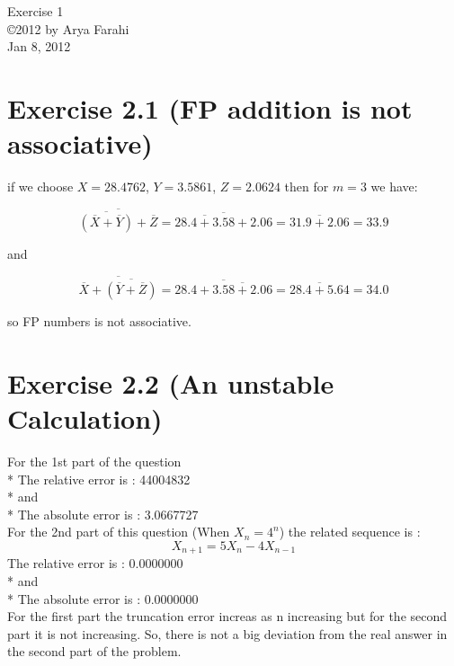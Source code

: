 \documentclass[10pt]{article}
\begin{document}
\begin{center}
{\large Exercise 1} \\
\copyright 2012 by Arya Farahi \\
Jan 8, 2012
\end{center}

\section{Exercise 2.1 (FP addition is not associative)}

if we choose $X = 28.4762$, $Y = 3.5861$, $Z = 2.0624$ then for $ m = 3 $ we have:

\begin{equation}
 \overline{\overline{ ( \overline{X} + \overline{Y} ) } + \overline{Z} } = \overline{\overline{28.4 + 3.58} + 2.06} = \overline{31.9 + 2.06} = 33.9   
\end{equation}

and
  
\begin{equation}
 \overline{ \overline{X} + \overline{ ( \overline{Y} + \overline{Z} ) } } = \overline{28.4 + \overline{3.58 + 2.06}} = \overline{28.4 + 5.64} = 34.0   
\end{equation}

so FP numbers is not associative.


\section{Exercise 2.2 (An unstable Calculation)}

For the 1st part of the question \\*
The relative error is :    44004832 \\*
and    \\*
The absolute error is :    3.0667727 \\

For the 2nd part of this question (When $X_n = 4^n$) the related sequence is : \\
\begin{equation}
 X_{n+1} = 5 X_n - 4 X_{n-1}   
\end{equation}
The relative error is :    0.0000000 \\*
and \\*
The absolute error is :    0.0000000 \\

For the first part the truncation error increas as n increasing but for the second part it is not increasing. So, there is not a big deviation from the real answer in the second part of the problem.\\
\end{document}
